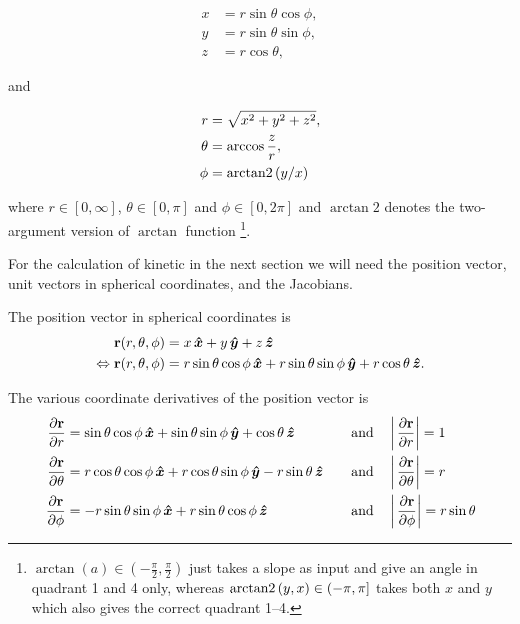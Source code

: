\begin{align}
    x &= r \sin{\theta}\cos{\phi}, \label{eq:x(q)} \\
    y &= r \sin{\theta}\sin{\phi}, \label{eq:y(q)}\\
    z &= r \cos{\theta}, \label{eq:z(q)}
\end{align}

and

\begin{align}
    r &= \sqrt{x^2 + y^2 + z^2}, \label{eq:r(x,y,z)}\\
    \theta &= \arccos{\frac{z}{r}}, \label{eq:theta(x,y,z)}\\
    \phi &= 
    \operatorname{arctan2}{(y/x)} \\
    \label{eq:phi(x,y,z)}
\end{align}

where \(r \in [0, \infty]\), \(\theta \in [0, \pi]\) and \(\phi \in [0, 2\pi]\) and \(\arctan2\) denotes the two-argument version of \(\arctan\) function \footnote{\(\arctan{(a)} \in (-\frac{\pi}{2}, \frac{\pi}{2})\) just takes a slope as input and give an angle in quadrant 1 and 4 only, whereas \(\operatorname{arctan2}{(y,x)} \in (-\pi, \pi]\) takes both \(x\) and \(y\) which also gives the correct quadrant 1–4.}\cite{WikiAtan2}.

For the calculation of kinetic in the next section we will need the position vector, unit vectors in spherical coordinates, and the Jacobians.

The position vector in spherical coordinates is
\begin{align}
    \mathbf{r}(r, \theta, \phi) &= x \operatorname{}\!\bm{\hat{x}} + y \operatorname{}\!\bm{\hat{y}} + z \operatorname{}\!\bm{\hat{z}} \\
    \Leftrightarrow \mathbf{r}(r, \theta, \phi) &= r \sin{\theta}\cos{\phi} \operatorname{}\!\bm{\hat{x}} + r \sin{\theta}\sin{\phi} \operatorname{}\!\bm{\hat{y}} + r \cos{\theta} \operatorname{}\!\bm{\hat{z}}. \label{eq:position-vec-spherical}
\end{align}

The various coordinate derivatives of the position vector is
\begin{align}
    \pd{\vec{r}}{r} &= \sin{\theta}\cos{\phi} \xhat + \sin{\theta}\sin{\phi} \yhat + \cos{\theta} \zhat \quad &\text{and} \quad &\left| \pd{\vec{r}}{r} \right| = 1 \label{eq:position-derived-r} \\
    \pd{\vec{r}}{\theta} &= r \cos{\theta}\cos{\phi} \xhat + r \cos{\theta}\sin{\phi} \yhat - r \sin{\theta} \zhat \quad &\text{and} \quad &\left| \pd{\vec{r}}{\theta} \right| = r \label{eq:position-derived-theta} \\
    \pd{\vec{r}}{\phi} &= -r\sin{\theta}\sin{\phi} \xhat + r\sin{\theta}\cos{\phi} \zhat \quad &\text{and} \quad &\left| \pd{\vec{r}}{\phi} \right| = r\sin{\theta} \label{eq:position-derived-phi}
\end{align}

